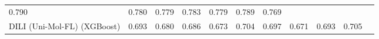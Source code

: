 \documentclass[
  10pt,
]{article}
\begin{document}
\begin{longtable}[]{@{}lllllllllll@{}}
\begin{minipage}[t]{0.07\columnwidth}
0.790\strut
\end{minipage} & \begin{minipage}[t]{0.07\columnwidth}\raggedright
0.780\strut
\end{minipage} & \begin{minipage}[t]{0.07\columnwidth}\raggedright
0.779\strut
\end{minipage} & \begin{minipage}[t]{0.07\columnwidth}\raggedright
0.783\strut
\end{minipage} & \begin{minipage}[t]{0.07\columnwidth}\raggedright
0.779\strut
\end{minipage} & \begin{minipage}[t]{0.07\columnwidth}\raggedright
0.789\strut
\end{minipage} & \begin{minipage}[t]{0.07\columnwidth}\raggedright
0.769\strut
\end{minipage}\tabularnewline
\begin{minipage}[t]{0.07\columnwidth}\raggedright
DILI (Uni-Mol-FL) (XGBoost)\strut
\end{minipage} & \begin{minipage}[t]{0.07\columnwidth}\raggedright
0.693\strut
\end{minipage} & \begin{minipage}[t]{0.07\columnwidth}\raggedright
0.680\strut
\end{minipage} & \begin{minipage}[t]{0.07\columnwidth}\raggedright
0.686\strut
\end{minipage} & \begin{minipage}[t]{0.07\columnwidth}\raggedright
0.673\strut
\end{minipage} & \begin{minipage}[t]{0.07\columnwidth}\raggedright
0.704\strut
\end{minipage} & \begin{minipage}[t]{0.07\columnwidth}\raggedright
0.697\strut
\end{minipage} & \begin{minipage}[t]{0.07\columnwidth}\raggedright
0.671\strut
\end{minipage} & \begin{minipage}[t]{0.07\columnwidth}\raggedright
0.693\strut
\end{minipage} & \begin{minipage}[t]{0.07\columnwidth}\raggedright
0.705\strut
\end{minipage} & \begin{minipage}[t]{0.07\columnwidth}\raggedright

\end{minipage}
\end{longtable}
\end{document}
